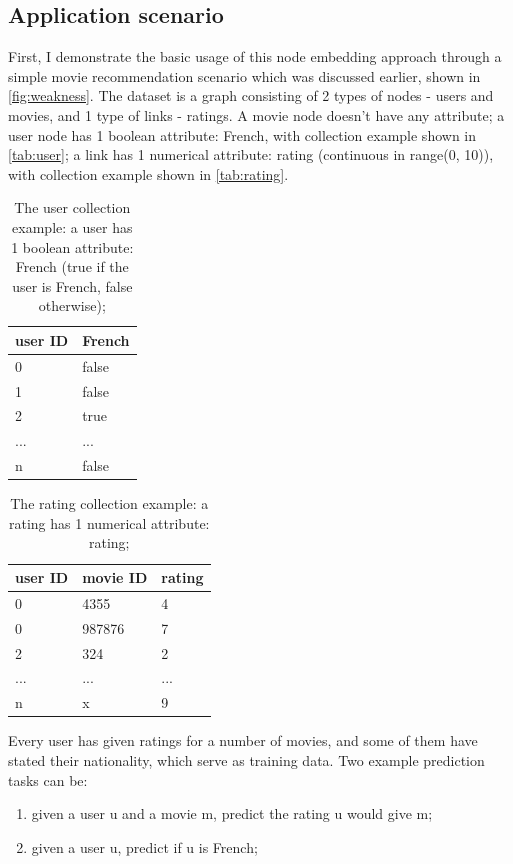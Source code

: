 \documentclass{article}
\begin{document}
\subsection{Application scenario}
First, I demonstrate the basic usage of this node embedding approach through a simple movie recommendation scenario which was discussed earlier, shown in \autoref{fig:weakness}. The dataset is a graph consisting of 2 types of nodes - users and movies, and 1 type of links - ratings. A movie node doesn't have any attribute; a user node has 1 boolean attribute: French, with collection example shown in \autoref{tab:user}; a link has 1 numerical attribute: rating (continuous in range(0, 10)), with collection example shown in \autoref{tab:rating}.
\begin{table}[h]
	\centering
	\begin{tabularx}{0.5\textwidth}{|X|X| }  \hline
		user ID & French \\ \hline
		0 & false \\ \hline
		1 & false \\ \hline
		2 & true \\ \hline
		... & ... \\ \hline
		n & false \\ \hline
	\end{tabularx}
	\caption{The user collection example: a user has 1 boolean attribute: French (true if the user is French, false otherwise);}
	\label{tab:user}
\end{table}
\begin{table}[h]
	\centering
	\begin{tabularx}{0.5\textwidth}{|X|X|X| }  \hline
		user ID & movie ID & rating \\ \hline
		0 & 4355 & 4 \\ \hline
		0 & 987876 & 7 \\ \hline
		2 & 324 & 2 \\ \hline
		... & ... & ... \\ \hline
		n & x & 9 \\ \hline
	\end{tabularx}
	\caption{The rating collection example: a rating has 1 numerical attribute: rating;}
	\label{tab:rating}
\end{table}
Every user has given ratings for a number of movies, and some of them have stated their nationality, which serve as training data. Two example prediction tasks can be:
\begin{enumerate}
	\item given a user u and a movie m, predict the rating u would give m;
	\item given a user u, predict if u is French;
\end{enumerate}
\end{document}
